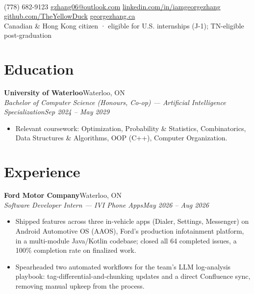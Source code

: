\documentclass[letterpaper,11pt]{article}
\newcommand{\sep}{\hspace{0.5em}\textcolor{accent!55}{\textbar}\hspace{0.5em}}
\newcommand{\entry}[4]{%
  \textbf{#1}\hfill{\small #2}\\[1pt]%
  {\small\itshape #3}\hfill{\small\itshape #4}\par%
}
\newenvironment{bullets}
  {\begin{itemize}[leftmargin=1.5em,labelsep=0.5em,itemsep=1pt,topsep=1pt,parsep=0pt,partopsep=0pt]\small}
  {\end{itemize}\vspace{1pt}}
\begin{document}
\begin{center}
  {\Huge\bfseries\color{accent}}\\[5pt]
  {\footnotesize
  (778) 682-9123 \sep
  \href{mailto:gzhang06@outlook.com}{gzhang06@outlook.com} \sep
  \href{https://linkedin.com/in/iamgeorgezhang}{linkedin.com/in/iamgeorgezhang} \sep
  \href{https://github.com/TheYellowDuck}{github.com/TheYellowDuck} \sep
  \href{https://georgezhang.ca}{georgezhang.ca}
  \\[3pt]Canadian \& Hong Kong citizen \; · \; eligible for U.S. internships (J-1); TN-eligible post-graduation}
\end{center}

\section{Education}
\entry{University of Waterloo}{Waterloo, ON}{Bachelor of Computer Science (Honours, Co-op) --- Artificial Intelligence Specialization}{Sep 2024 -- May 2029}
\begin{bullets}
  \item Relevant coursework: Optimization, Probability \& Statistics, Combinatorics, Data Structures \& Algorithms, OOP (C++), Computer Organization.
\end{bullets}

\section{Experience}

\entry{Ford Motor Company}{Waterloo, ON}{Software Developer Intern --- IVI Phone Apps}{May 2026 -- Aug 2026}
\begin{bullets}
  \item Shipped features across three in-vehicle apps (Dialer, Settings, Messenger) on Android Automotive OS (AAOS), Ford's production infotainment platform, in a multi-module Java/Kotlin codebase; closed all 64 completed issues, a 100\% completion rate on finalized work.
  \item Spearheaded two automated workflows for the team's LLM log-analysis playbook: tag-differential-and-chunking updates and a direct Confluence sync, removing manual upkeep from the process.
\end{bullets}
\end{document}
